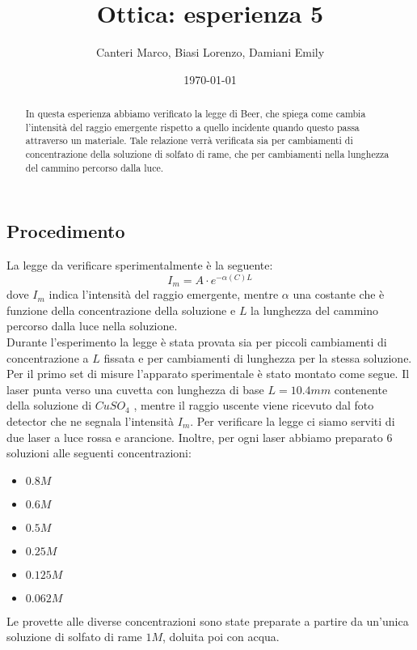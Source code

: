 \documentclass[letterpaper,11pt]{article}
\title{\textbf{Ottica:} esperienza 5}
\author{Canteri Marco, Biasi Lorenzo, Damiani Emily}
\date{\today}
\begin{document}
\maketitle

\begin{abstract}
\hspace{-1.9em}
In questa esperienza abbiamo verificato la legge di Beer, che spiega come cambia l'intensità del raggio emergente rispetto a quello incidente quando questo passa attraverso un materiale. Tale relazione verrà verificata sia per cambiamenti di concentrazione della soluzione di solfato di rame, che per cambiamenti nella lunghezza del cammino percorso dalla luce. 
\end{abstract}

\begin{body}
\section{Procedimento}
La legge da verificare sperimentalmente è la seguente: 
\begin{equation}
I_m = A \cdot e^{-\alpha (C) L}
\end{equation}
dove $I_m$ indica l'intensità del raggio emergente, mentre $\alpha$ una costante che è funzione della concentrazione della soluzione e $L$ la lunghezza del cammino percorso dalla luce nella soluzione. \\
Durante l'esperimento la legge è stata provata sia per piccoli cambiamenti di concentrazione a $L$ fissata e per cambiamenti di lunghezza per la stessa soluzione. \\
Per il primo set di misure l'apparato sperimentale è stato montato come segue. Il laser punta verso una cuvetta con lunghezza di base $L = 10.4 mm$ contenente della soluzione di $CuSO_4$ , mentre il raggio uscente viene ricevuto dal foto detector che ne segnala l'intensità $I_m$. Per verificare la legge ci siamo serviti di due laser a luce rossa e arancione. Inoltre, per ogni laser abbiamo preparato $6$ soluzioni alle seguenti concentrazioni: 
\begin{itemize}
\item $0.8 M$
\item $0.6 M $
\item $0.5 M$
\item $0.25 M$
\item $0.125 M$
\item $0.062 M $ 
\end{itemize}
Le provette alle diverse concentrazioni sono state preparate a partire da un'unica soluzione di solfato di rame $1 M$, doluita poi con acqua. \\

\end{body}
\end{document}
